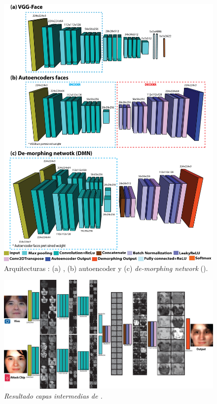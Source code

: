 \begin{figure}[t!]
    \centering
    \includegraphics[width=1\textwidth]{ch-sistemasABC/images/ch-morphing/ARQUITECTURAS_LEYENDA_GRANDE.png}
    \caption{Arquitecturas : (a)  \cite{parkhi2015deep}, (b) \Gls{autoencoder} y (c) \textit{\Gls{de-morphing} network} ().}
    \label{fig:Arquitecturas}
\end{figure}

\begin{figure}[t!]
    \centering
    \includegraphics[width=1\textwidth]{ch-sistemasABC/images/ch-morphing/De-moprhingProcess.png}
    \caption{\textit{Resultado capas intermedias de .}}
    \label{fig:MorphingAndDe-morphingExplanation}
\end{figure}

